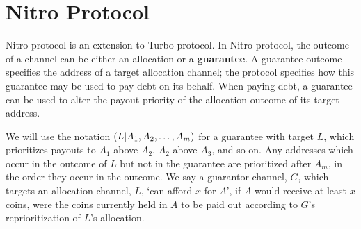 \documentclass{article}
\begin{document}
\section{Nitro Protocol}

Nitro protocol is an extension to Turbo protocol.
In Nitro protocol, the outcome of a channel can be either an allocation or a \textbf{guarantee}.
A guarantee outcome specifies the address of a target allocation channel; the protocol specifies how this guarantee may be used to pay debt on its behalf.
When paying debt, a guarantee can be used to alter the payout priority of the allocation outcome of its target address. 



We will use the notation $( L | A_1, A_2, \dots, A_m )$ for a guarantee with target $L$, which prioritizes payouts to $A_1$ above $A_2$, $A_2$ above $A_3$, and so on.
Any addresses which occur in the outcome of $L$ but not in the guarantee are prioritized after $A_m$, in the order they occur in the outcome.
We say a guarantor channel, $G$, which targets an allocation channel, $L$, `can afford $x$ for $A$', if $A$ would receive at least $x$ coins, were the coins currently held in $A$ to be paid out according to $G$'s reprioritization of $L$'s allocation.
\end{document}
